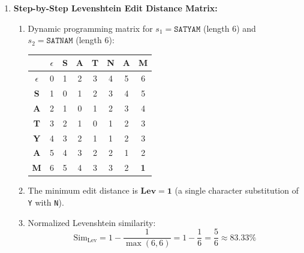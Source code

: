 \begin{enumerate}[label=\textbf{P11.\arabic*}]
    \item \textbf{Step-by-Step Levenshtein Edit Distance Matrix:}
    \begin{enumerate}[label=(\alph*)]
        \item Dynamic programming matrix for $s_1 = \texttt{SATYAM}$ (length 6) and $s_2 = \texttt{SATNAM}$ (length 6):
        \begin{center}
        \small
        \begin{tabular}{c|ccccccc}
        \toprule
        & $\epsilon$ & \textbf{S} & \textbf{A} & \textbf{T} & \textbf{N} & \textbf{A} & \textbf{M} \\
        \midrule
        $\epsilon$ & 0 & 1 & 2 & 3 & 4 & 5 & 6 \\
        \textbf{S} & 1 & 0 & 1 & 2 & 3 & 4 & 5 \\
        \textbf{A} & 2 & 1 & 0 & 1 & 2 & 3 & 4 \\
        \textbf{T} & 3 & 2 & 1 & 0 & 1 & 2 & 3 \\
        \textbf{Y} & 4 & 3 & 2 & 1 & 1 & 2 & 3 \\
        \textbf{A} & 5 & 4 & 3 & 2 & 2 & 1 & 2 \\
        \textbf{M} & 6 & 5 & 4 & 3 & 3 & 2 & \textbf{1} \\
        \bottomrule
        \end{tabular}
        \end{center}
        \item The minimum edit distance is $\mathbf{Lev = 1}$ (a single character substitution of \texttt{Y} with \texttt{N}).
        \item Normalized Levenshtein similarity:
        \begin{equation*}
        \text{Sim}_{\text{Lev}} = 1 - \frac{1}{\max(6, 6)} = 1 - \frac{1}{6} = \frac{5}{6} \approx \mathbf{83.33\%}
        \end{equation*}
    \end{enumerate}


\end{enumerate}
